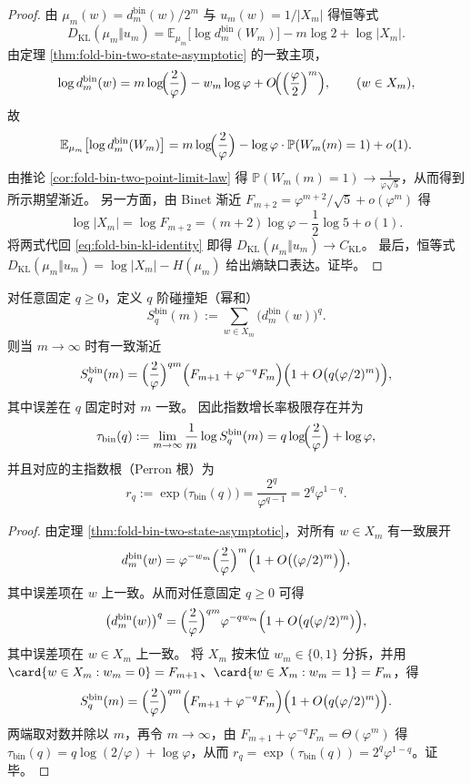 \begin{proof}
由 \(\mu_m(w)=d^{\mathrm{bin}}_m(w)/2^m\) 与 \(u_m(w)=1/|X_m|\) 得恒等式
\begin{equation}\label{eq:fold-bin-kl-identity}
D_{\mathrm{KL}}(\mu_m\Vert u_m)
=\mathbb{E}_{\mu_m}\bigl[\log d^{\mathrm{bin}}_m(W_m)\bigr]-m\log 2+\log|X_m|.
\end{equation}
由定理 \ref{thm:fold-bin-two-state-asymptotic} 的一致主项，
\[
\log d^{\mathrm{bin}}_m(w)
=m\log\!\Bigl(\frac{2}{\varphi}\Bigr)-w_m\log\varphi+O\!\Bigl(\Bigl(\frac{\varphi}{2}\Bigr)^m\Bigr),
\qquad (w\in X_m),
\]
故
\[
\mathbb{E}_{\mu_m}\bigl[\log d^{\mathrm{bin}}_m(W_m)\bigr]
=m\log\!\Bigl(\frac{2}{\varphi}\Bigr)-\log\varphi\cdot \mathbb{P}(W_m(m)=1)+o(1).
\]
由推论 \ref{cor:fold-bin-two-point-limit-law} 得 \(\mathbb{P}(W_m(m)=1)\to \frac{1}{\varphi\sqrt5}\)，从而得到所示期望渐近。
另一方面，由 Binet 渐近 \(F_{m+2}=\varphi^{m+2}/\sqrt5+o(\varphi^m)\) 得
\[
\log|X_m|=\log F_{m+2}=(m+2)\log\varphi-\frac12\log 5+o(1).
\]
将两式代回 \eqref{eq:fold-bin-kl-identity} 即得 \(D_{\mathrm{KL}}(\mu_m\Vert u_m)\to C_{\mathrm{KL}}\)。
最后，恒等式 \(D_{\mathrm{KL}}(\mu_m\Vert u_m)=\log|X_m|-H(\mu_m)\) 给出熵缺口表达。证毕。
\end{proof}

\begin{proposition}\label{prop:fold-bin-power-sum-asymptotic}
对任意固定 \(q\ge 0\)，定义 \(q\) 阶碰撞矩（幂和）
\[
S_q^{\mathrm{bin}}(m):=\sum_{w\in X_m}\bigl(d^{\mathrm{bin}}_m(w)\bigr)^q.
\]
则当 \(m\to\infty\) 时有一致渐近
\[
S_q^{\mathrm{bin}}(m)=\Bigl(\frac{2}{\varphi}\Bigr)^{qm}\Bigl(F_{m+1}+\varphi^{-q}F_m\Bigr)\Bigl(1+O\bigl(q(\varphi/2)^m\bigr)\Bigr),
\]
其中误差在 \(q\) 固定时对 \(m\) 一致。
因此指数增长率极限存在并为
\[
\tau_{\mathrm{bin}}(q):=\lim_{m\to\infty}\frac{1}{m}\log S_q^{\mathrm{bin}}(m)
=q\log\!\Bigl(\frac{2}{\varphi}\Bigr)+\log\varphi,
\]
并且对应的主指数根（Perron 根）为
\[
r_q:=\exp\bigl(\tau_{\mathrm{bin}}(q)\bigr)=\frac{2^q}{\varphi^{q-1}}=2^q\varphi^{1-q}.
\]
\end{proposition}

\begin{proof}
由定理 \ref{thm:fold-bin-two-state-asymptotic}，对所有 \(w\in X_m\) 有一致展开
\[
d^{\mathrm{bin}}_m(w)=\varphi^{-w_m}\Bigl(\frac{2}{\varphi}\Bigr)^m\Bigl(1+O\bigl((\varphi/2)^m\bigr)\Bigr),
\]
其中误差项在 \(w\) 上一致。从而对任意固定 \(q\ge 0\) 可得
\[
\bigl(d^{\mathrm{bin}}_m(w)\bigr)^q
=\Bigl(\frac{2}{\varphi}\Bigr)^{qm}\varphi^{-q w_m}\Bigl(1+O\bigl(q(\varphi/2)^m\bigr)\Bigr),
\]
其中误差项在 \(w\in X_m\) 上一致。
将 \(X_m\) 按末位 \(w_m\in\{0,1\}\) 分拆，并用
\(
\card\{w\in X_m:w_m=0\}=F_{m+1}
\)、\(
\card\{w\in X_m:w_m=1\}=F_{m}
\)，得
\[
S_q^{\mathrm{bin}}(m)
=\Bigl(\frac{2}{\varphi}\Bigr)^{qm}\Bigl(F_{m+1}+\varphi^{-q}F_m\Bigr)\Bigl(1+O\bigl(q(\varphi/2)^m\bigr)\Bigr).
\]
两端取对数并除以 \(m\)，再令 \(m\to\infty\)，由 \(F_{m+1}+\varphi^{-q}F_m=\Theta(\varphi^m)\) 得
\(\tau_{\mathrm{bin}}(q)=q\log(2/\varphi)+\log\varphi\)，从而 \(r_q=\exp(\tau_{\mathrm{bin}}(q))=2^q\varphi^{1-q}\)。证毕。
\end{proof}

